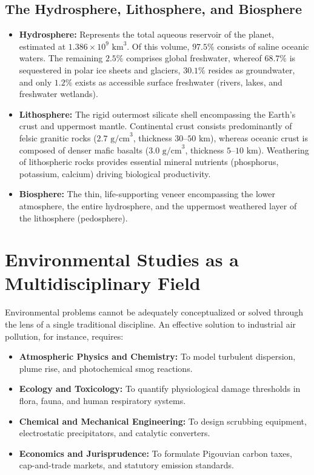 \subsection{The Hydrosphere, Lithosphere, and Biosphere}
\begin{itemize}[leftmargin=1.5em]
    \item \textbf{Hydrosphere:} Represents the total aqueous reservoir of the planet, estimated at $1.386 \times 10^9\text{ km}^3$. Of this volume, $97.5\%$ consists of saline oceanic waters. The remaining $2.5\%$ comprises global freshwater, whereof $68.7\%$ is sequestered in polar ice sheets and glaciers, $30.1\%$ resides as groundwater, and only $1.2\%$ exists as accessible surface freshwater (rivers, lakes, and freshwater wetlands).
    \item \textbf{Lithosphere:} The rigid outermost silicate shell encompassing the Earth's crust and uppermost mantle. Continental crust consists predominantly of felsic granitic rocks ($2.7\text{ g/cm}^3$, thickness $30\text{--}50\text{ km}$), whereas oceanic crust is composed of denser mafic basalts ($3.0\text{ g/cm}^3$, thickness $5\text{--}10\text{ km}$). Weathering of lithospheric rocks provides essential mineral nutrients (phosphorus, potassium, calcium) driving biological productivity.
    \item \textbf{Biosphere:} The thin, life-supporting veneer encompassing the lower atmosphere, the entire hydrosphere, and the uppermost weathered layer of the lithosphere (pedosphere).
\end{itemize}

\section{Environmental Studies as a Multidisciplinary Field}
Environmental problems cannot be adequately conceptualized or solved through the lens of a single traditional discipline. An effective solution to industrial air pollution, for instance, requires:
\begin{itemize}[leftmargin=1.5em]
    \item \textbf{Atmospheric Physics and Chemistry:} To model turbulent dispersion, plume rise, and photochemical smog reactions.
    \item \textbf{Ecology and Toxicology:} To quantify physiological damage thresholds in flora, fauna, and human respiratory systems.
    \item \textbf{Chemical and Mechanical Engineering:} To design scrubbing equipment, electrostatic precipitators, and catalytic converters.
    \item \textbf{Economics and Jurisprudence:} To formulate Pigouvian carbon taxes, cap-and-trade markets, and statutory emission standards.
\end{itemize}

